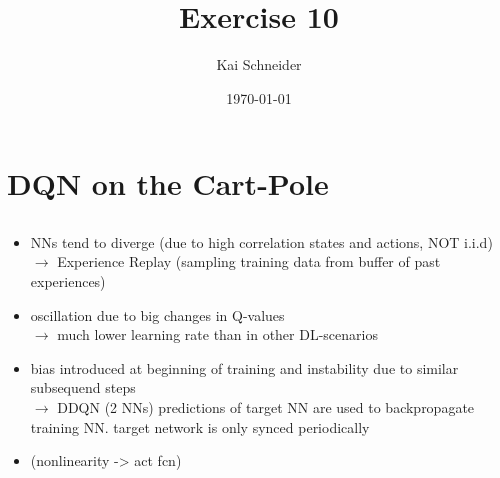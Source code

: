 \documentclass[11pt,a4paper]{article}
\title{Exercise 10}
\author{Kai Schneider}
\date{\today}
\begin{document}
 

\maketitle

\section{DQN on the Cart-Pole}

\subsection{}

\begin{itemize}
  \item NNs tend to diverge (due to high correlation states and actions, NOT i.i.d) \\ $\rightarrow$
        Experience Replay (sampling training data from buffer of past experiences)
  \item oscillation due to big changes in Q-values \\ $\rightarrow$
        much lower learning rate than in other DL-scenarios
  \item bias introduced at beginning of training and instability due to similar subsequend steps \\ $\rightarrow$ 
        DDQN (2 NNs) predictions of target NN are used to backpropagate training NN.
        target network is only synced periodically
  \item (nonlinearity -> act fcn)
\end{itemize}
\end{document}

